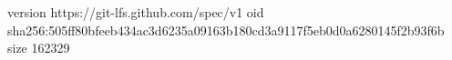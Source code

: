version https://git-lfs.github.com/spec/v1
oid sha256:505ff80bfeeb434ac3d6235a09163b180cd3a9117f5eb0d0a6280145f2b93f6b
size 162329
